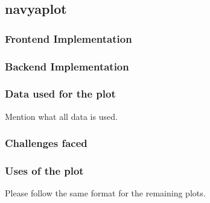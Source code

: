 \documentclass[12pt]{article}
\begin{document}
\subsection{navyaplot}
\subsubsection{Frontend Implementation}
\subsubsection{Backend Implementation}
\subsubsection{Data used for the plot}
Mention what all data is used.
\subsubsection{Challenges faced}
\subsubsection{Uses of the plot}

\bigskip
Please follow the same format for the remaining plots.
\end{document}
